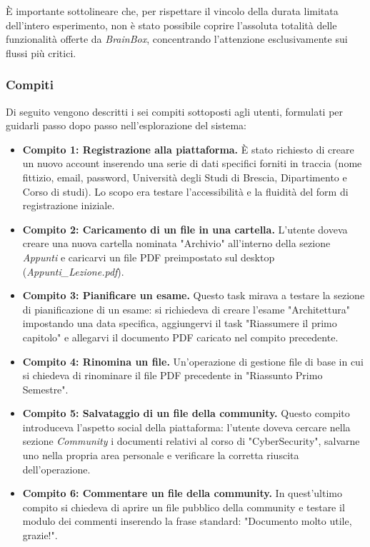 È importante sottolineare che, per rispettare il vincolo della durata limitata dell'intero esperimento, non è stato possibile coprire l'assoluta totalità delle funzionalità offerte da \textit{BrainBox}, concentrando l'attenzione esclusivamente sui flussi più critici.

\subsubsection{Compiti}
Di seguito vengono descritti i sei compiti sottoposti agli utenti, formulati per guidarli passo dopo passo nell'esplorazione del sistema:

\begin{itemize}
    \item \textbf{Compito 1: Registrazione alla piattaforma.} È stato richiesto di creare un nuovo account inserendo una serie di dati specifici forniti in traccia (nome fittizio, email, password, Università degli Studi di Brescia, Dipartimento e Corso di studi). Lo scopo era testare l'accessibilità e la fluidità del form di registrazione iniziale.
    
    \item \textbf{Compito 2: Caricamento di un file in una cartella.} L'utente doveva creare una nuova cartella nominata "Archivio" all'interno della sezione \textit{Appunti} e caricarvi un file PDF preimpostato sul desktop (\textit{Appunti\_Lezione.pdf}).
    
    \item \textbf{Compito 3: Pianificare un esame.} Questo task mirava a testare la sezione di pianificazione di un esame: si richiedeva di creare l'esame "Architettura" impostando una data specifica, aggiungervi il task "Riassumere il primo capitolo" e allegarvi il documento PDF caricato nel compito precedente.
    
    \item \textbf{Compito 4: Rinomina un file.} Un'operazione di gestione file di base in cui si chiedeva di rinominare il file PDF precedente in "Riassunto Primo Semestre".
    
    \item \textbf{Compito 5: Salvataggio di un file della community.} Questo compito introduceva l'aspetto social della piattaforma: l'utente doveva cercare nella sezione \textit{Community} i documenti relativi al corso di "CyberSecurity", salvarne uno nella propria area personale e verificare la corretta riuscita dell'operazione.
    
    \item \textbf{Compito 6: Commentare un file della community.} In quest'ultimo compito si chiedeva di aprire un file pubblico della community e testare il modulo dei commenti inserendo la frase standard: "Documento molto utile, grazie!".
\end{itemize}

